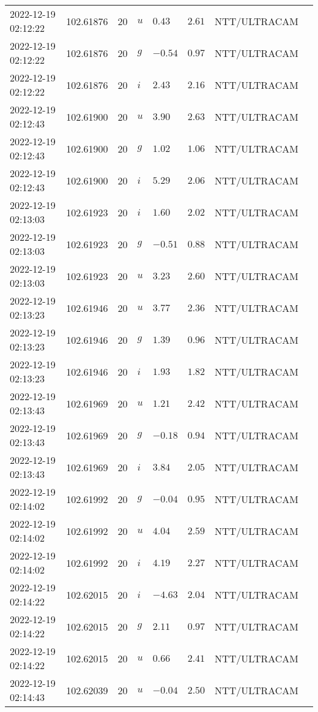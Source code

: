 \documentclass{nature_plusfigure}
\begin{document}
\begin{supplement}
\begin{center}
\begin{longtable}{llllllll}
2022-12-19 02:12:22 & 102.61876 & 20 & $u$ & $0.43$ & $2.61$ & NTT/ULTRACAM &  \\ 
2022-12-19 02:12:22 & 102.61876 & 20 & $g$ & $-0.54$ & $0.97$ & NTT/ULTRACAM &  \\ 
2022-12-19 02:12:22 & 102.61876 & 20 & $i$ & $2.43$ & $2.16$ & NTT/ULTRACAM &  \\ 
2022-12-19 02:12:43 & 102.61900 & 20 & $u$ & $3.90$ & $2.63$ & NTT/ULTRACAM &  \\ 
2022-12-19 02:12:43 & 102.61900 & 20 & $g$ & $1.02$ & $1.06$ & NTT/ULTRACAM &  \\ 
2022-12-19 02:12:43 & 102.61900 & 20 & $i$ & $5.29$ & $2.06$ & NTT/ULTRACAM &  \\ 
2022-12-19 02:13:03 & 102.61923 & 20 & $i$ & $1.60$ & $2.02$ & NTT/ULTRACAM &  \\ 
2022-12-19 02:13:03 & 102.61923 & 20 & $g$ & $-0.51$ & $0.88$ & NTT/ULTRACAM &  \\ 
2022-12-19 02:13:03 & 102.61923 & 20 & $u$ & $3.23$ & $2.60$ & NTT/ULTRACAM &  \\ 
2022-12-19 02:13:23 & 102.61946 & 20 & $u$ & $3.77$ & $2.36$ & NTT/ULTRACAM &  \\ 
2022-12-19 02:13:23 & 102.61946 & 20 & $g$ & $1.39$ & $0.96$ & NTT/ULTRACAM &  \\ 
2022-12-19 02:13:23 & 102.61946 & 20 & $i$ & $1.93$ & $1.82$ & NTT/ULTRACAM &  \\ 
2022-12-19 02:13:43 & 102.61969 & 20 & $u$ & $1.21$ & $2.42$ & NTT/ULTRACAM &  \\ 
2022-12-19 02:13:43 & 102.61969 & 20 & $g$ & $-0.18$ & $0.94$ & NTT/ULTRACAM &  \\ 
2022-12-19 02:13:43 & 102.61969 & 20 & $i$ & $3.84$ & $2.05$ & NTT/ULTRACAM &  \\ 
2022-12-19 02:14:02 & 102.61992 & 20 & $g$ & $-0.04$ & $0.95$ & NTT/ULTRACAM &  \\ 
2022-12-19 02:14:02 & 102.61992 & 20 & $u$ & $4.04$ & $2.59$ & NTT/ULTRACAM &  \\ 
2022-12-19 02:14:02 & 102.61992 & 20 & $i$ & $4.19$ & $2.27$ & NTT/ULTRACAM &  \\ 
2022-12-19 02:14:22 & 102.62015 & 20 & $i$ & $-4.63$ & $2.04$ & NTT/ULTRACAM &  \\ 
2022-12-19 02:14:22 & 102.62015 & 20 & $g$ & $2.11$ & $0.97$ & NTT/ULTRACAM &  \\ 
2022-12-19 02:14:22 & 102.62015 & 20 & $u$ & $0.66$ & $2.41$ & NTT/ULTRACAM &  \\ 
2022-12-19 02:14:43 & 102.62039 & 20 & $u$ & $-0.04$ & $2.50$ & NTT/ULTRACAM &  \\ 

\end{longtable}
\end{center}
\end{supplement}
\end{document}
